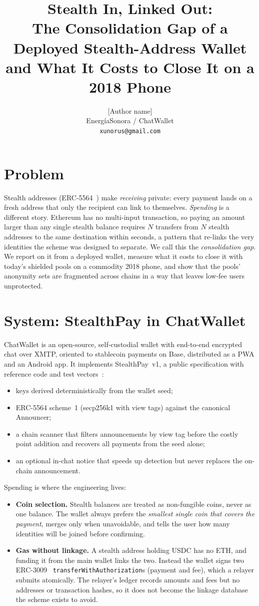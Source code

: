 \documentclass[10pt]{article}
\title{\vspace{-1.5em}\textbf{Stealth In, Linked Out:}\\[0.2em]
\large The Consolidation Gap of a Deployed Stealth-Address Wallet\\
and What It Costs to Close It on a 2018 Phone}
\author{[Author name]\\ \small EnergíaSonora / ChatWallet \\ \small \texttt{xunorus@gmail.com}}
\date{\vspace{-1.2em}}
\begin{document}
\maketitle

\section*{Problem}
Stealth addresses (ERC-5564~\cite{erc5564}) make \emph{receiving} private: every payment lands
on a fresh address that only the recipient can link to themselves. \emph{Spending} is a
different story. Ethereum has no multi-input transaction, so paying an amount larger than any
single stealth balance requires $N$ transfers from $N$ stealth addresses to the same
destination within seconds, a pattern that re-links the very identities the scheme was
designed to separate. We call this the \emph{consolidation gap}. We report on it from a
deployed wallet, measure what it costs to close it with today's shielded pools on a
commodity 2018 phone, and show that the pools' anonymity sets are fragmented across chains
in a way that leaves low-fee users unprotected.

\section*{System: StealthPay in ChatWallet}
ChatWallet is an open-source, self-custodial wallet with end-to-end encrypted chat over
XMTP, oriented to stablecoin payments on Base, distributed as a PWA and an Android app. It implements
StealthPay~v1, a public specification with reference code and test
vectors~\cite{stealthpay}:
\begin{itemize}\setlength\itemsep{0em}
\item keys derived deterministically from the wallet seed;
\item ERC-5564 scheme~1 (secp256k1 with view tags) against the canonical Announcer;
\item a chain scanner that filters announcements by view tag before the costly point addition and recovers all payments from the seed alone;
\item an optional in-chat notice that speeds up detection but never replaces the on-chain announcement.
\end{itemize}
Spending is where the engineering lives:
\begin{itemize}\setlength\itemsep{0em}
\item \textbf{Coin selection.} Stealth balances are treated as non-fungible coins, never as one balance. The wallet always prefers the \emph{smallest single coin that covers the payment}, merges only when unavoidable, and tells the user how many identities will be joined before confirming.
\item \textbf{Gas without linkage.} A stealth address holding USDC has no ETH, and funding it from the main wallet links the two. Instead the wallet signs two ERC-3009~\cite{erc3009} \texttt{transferWithAuthorization}s (payment and fee), which a relayer submits atomically. The relayer's ledger records amounts and fees but no addresses or transaction hashes, so it does not become the linkage database the scheme exists to avoid.
\end{itemize}
\end{document}
